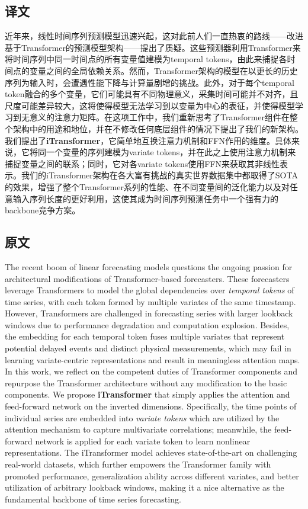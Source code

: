 \documentclass[twoside,12pt]{article}
\newcommand{\update}[1]{{\textcolor{black}{#1}}}
\begin{document}
\subsection{译文}
近年来，线性时间序列预测模型迅速兴起，这对此前人们一直热衷的路线——改进基于Transformer的预测模型架构——提出了质疑。这些预测器利用Transformer来将时间序列中同一时间点的所有变量值建模为temporal tokens，由此来捕捉各时间点的变量之间的全局依赖关系。然而，Transformer架构的模型在以更长的历史序列为输入时，会遭遇性能下降与计算量剧增的挑战。此外，对于每个temporal token融合的多个变量，它们可能具有不同物理意义，采集时间可能并不对齐，且尺度可能差异较大，这将使得模型无法学习到以变量为中心的表征，并使得模型学习到无意义的注意力矩阵。在这项工作中，我们重新思考了Transformer组件在整个架构中的用途和地位，并在不修改任何底层组件的情况下提出了我们的新架构。我们提出了\textbf{iTransformer}，它简单地互换注意力机制和FFN作用的维度。具体来说，它将同一个变量的序列建模为variate tokens，并在此之上使用注意力机制来捕捉变量之间的联系；同时，它对各variate tokens使用FFN来获取其非线性表示。我们的iTransformer架构在各大富有挑战的真实世界数据集中都取得了SOTA的效果，增强了整个Transformer系列的性能、在不同变量间的泛化能力以及对任意输入序列长度的更好利用，这使其成为时间序列预测任务中一个强有力的backbone竞争方案。

\subsection{原文}
The recent boom of linear forecasting models questions the ongoing passion for architectural modifications of Transformer-based forecasters. These forecasters leverage Transformers to model the global dependencies over \emph{temporal tokens} of time series, with each token formed by multiple variates of the same timestamp. However, Transformers are challenged in forecasting series with larger lookback windows due to performance degradation and computation explosion. Besides, the embedding for each temporal token fuses multiple variates \update{that represent potential delayed events and distinct physical measurements}, which may fail in learning variate-centric representations and result in meaningless attention maps. In this work, we reflect on the competent duties of Transformer components and repurpose the Transformer architecture without any modification to the basic components. We propose \textbf{iTransformer} that simply \update{applies the attention and feed-forward network on the inverted dimensions}. Specifically, the time points of individual series are embedded into \emph{variate tokens} which are utilized by the attention mechanism to capture multivariate correlations; meanwhile, the feed-forward network is applied for each variate token to learn nonlinear representations. The iTransformer model achieves state-of-the-art on challenging real-world datasets, which further empowers the Transformer family with promoted performance, generalization ability across different variates, and better utilization of arbitrary lookback windows, making it a nice alternative as the fundamental backbone of time series forecasting.
\end{document}
